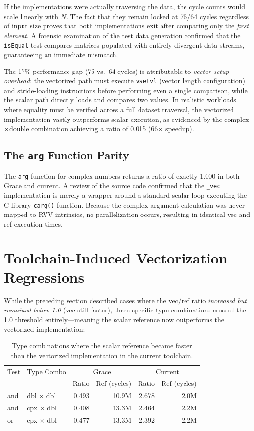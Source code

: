 If the implementations were actually traversing the data, the cycle counts would scale linearly with $N$. The fact that they remain locked at 75/64 cycles regardless of input size proves that both implementations exit after comparing only the \emph{first element}. A forensic examination of the test data generation confirmed that the \texttt{isEqual} test compares matrices populated with entirely divergent data streams, guaranteeing an immediate mismatch.

The 17\% performance gap (75 vs.\ 64 cycles) is attributable to \emph{vector setup overhead}: the vectorized path must execute \texttt{vsetvl} (vector length configuration) and stride-loading instructions before performing even a single comparison, while the scalar path directly loads and compares two values. In realistic workloads where equality must be verified across a full dataset traversal, the vectorized implementation vastly outperforms scalar execution, as evidenced by the complex$\times$double combination achieving a ratio of 0.015 (66$\times$ speedup).

\subsection{The \texttt{arg} Function Parity}

The \texttt{arg} function for complex numbers returns a ratio of exactly 1.000 in both Grace and current. A review of the source code confirmed that the \texttt{\_vec} implementation is merely a wrapper around a standard scalar loop executing the C library \texttt{carg()} function. Because the complex argument calculation was never mapped to RVV intrinsics, no parallelization occurs, resulting in identical vec and ref execution times.

\section{Toolchain-Induced Vectorization Regressions}

While the preceding section described cases where the vec/ref ratio \emph{increased but remained below 1.0} (vec still faster), three specific type combinations crossed the 1.0 threshold entirely---meaning the scalar reference now outperforms the vectorized implementation:

\begin{table}[H]
\centering
\caption{Type combinations where the scalar reference became faster than the vectorized implementation in the current toolchain.}
\label{tab:regressions}
\small
\begin{tabular}{l l r r r r}
\toprule
Test & Type Combo & \multicolumn{2}{c}{Grace} & \multicolumn{2}{c}{Current} \\
 & & Ratio & Ref (cycles) & Ratio & Ref (cycles) \\
\midrule
and & dbl $\times$ dbl & 0.493 & 10.9M & 2.678 & 2.0M \\
and & cpx $\times$ dbl & 0.408 & 13.3M & 2.464 & 2.2M \\
or & cpx $\times$ dbl & 0.477 & 13.3M & 2.392 & 2.2M \\
\bottomrule
\end{tabular}
\end{table}

